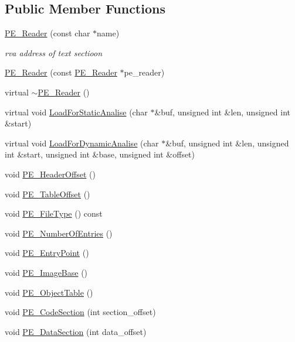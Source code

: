 \subsection*{Public Member Functions}
\begin{DoxyCompactItemize}
\item 
\hyperlink{classPE__Reader_a3ee3c529ba07e5cfe8d288fa3ebfa4f9}{PE\_\-Reader} (const char $\ast$name)
\begin{DoxyCompactList}\small\item\em rva address of text sectioon \item\end{DoxyCompactList}\item 
\hyperlink{classPE__Reader_a49781859b63b5d08f49e306f62fc103d}{PE\_\-Reader} (const \hyperlink{classPE__Reader}{PE\_\-Reader} $\ast$pe\_\-reader)
\item 
virtual \hyperlink{classPE__Reader_a6fbfdcd447011a83ac2147874c8e8b4a}{$\sim$PE\_\-Reader} ()
\item 
virtual void \hyperlink{classPE__Reader_a4b5e1c738c887247181c4e3d0f253c27}{LoadForStaticAnalise} (char $\ast$\&buf, unsigned int \&len, unsigned int \&start)
\item 
virtual void \hyperlink{classPE__Reader_ad11f69fdbf231385c9ff7edd26913af7}{LoadForDynamicAnalise} (char $\ast$\&buf, unsigned int \&len, unsigned int \&start, unsigned int \&base, unsigned int \&offset)
\item 
void \hyperlink{classPE__Reader_a6d3abab07f8d39fd1414cad8efb06418}{PE\_\-HeaderOffset} ()
\item 
void \hyperlink{classPE__Reader_a32781a8fee1c88e2ec864ffd1657a192}{PE\_\-TableOffset} ()
\item 
void \hyperlink{classPE__Reader_a492ea400cbf11105f029faab31d0f3fa}{PE\_\-FileType} () const 
\item 
void \hyperlink{classPE__Reader_a6263cdcff862839e6fbbd296c0e060e8}{PE\_\-NumberOfEntries} ()
\item 
void \hyperlink{classPE__Reader_a37d6bf9d6e462f964d77115e29c22418}{PE\_\-EntryPoint} ()
\item 
void \hyperlink{classPE__Reader_a1f263c2df5da0e49bb5211617ae10335}{PE\_\-ImageBase} ()
\item 
void \hyperlink{classPE__Reader_a4896824d5df4cff3d693367fd8d8d454}{PE\_\-ObjectTable} ()
\item 
void \hyperlink{classPE__Reader_a70cf8c6c789cc8c5c96a2b9179043a24}{PE\_\-CodeSection} (int section\_\-offset)
\item 
void \hyperlink{classPE__Reader_a8303dc43c8732907ea8eff507728262b}{PE\_\-DataSection} (int data\_\-offset)
\end{DoxyCompactItemize}


